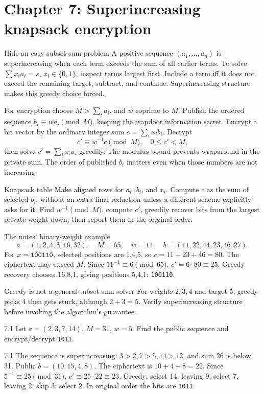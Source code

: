 \documentclass[11pt,a4paper]{article}
\begin{document}
\section{Chapter 7: Superincreasing knapsack encryption}
\begin{concept}{Hide an easy subset-sum problem}
A positive sequence \((a_1,\ldots,a_n)\) is superincreasing when each term exceeds the sum of all earlier terms. To solve \(\sum x_i a_i=s\), \(x_i\in\{0,1\}\), inspect terms largest first. Include a term iff it does not exceed the remaining target, subtract, and continue. Superincreasing structure makes this greedy choice forced.

For encryption choose \(M>\sum_i a_i\), and \(w\) coprime to \(M\). Publish the ordered sequence \(b_i\equiv wa_i\pmod M\), keeping the trapdoor information secret. Encrypt a bit vector by the ordinary integer sum \(c=\sum_i x_i b_i\). Decrypt
\[c'\equiv w^{-1}c\pmod M,\quad0\le c'<M,\]
then solve \(c'=\sum_i x_i a_i\) greedily. The modulus bound prevents wraparound in the private sum. The order of published \(b_i\) matters even when those numbers are not increasing.
\end{concept}
\begin{method}{Knapsack table}
Make aligned rows for \(a_i\), \(b_i\), and \(x_i\). Compute \(c\) as the sum of selected \(b_i\), without an extra final reduction unless a different scheme explicitly asks for it. Find \(w^{-1}\pmod M\), compute \(c'\), greedily recover bits from the largest private weight down, then report them in the original order.
\end{method}
\begin{example}{The notes' binary-weight example}
\[a=(1,2,4,8,16,32),\quad M=65,\quad w=11,\quad b=(11,22,44,23,46,27).\]
For \(x=\texttt{100110}\), selected positions are 1,4,5, so \(c=11+23+46=80\). The ciphertext may exceed \(M\). Since \(11^{-1}\equiv6\pmod{65}\), \(c'=6\cdot80\equiv25\). Greedy recovery chooses 16,8,1, giving positions 5,4,1: \texttt{100110}.
\end{example}
\begin{tip}{Greedy is not a general subset-sum solver}
For weights \(2,3,4\) and target 5, greedy picks 4 then gets stuck, although \(2+3=5\). Verify superincreasing structure before invoking the algorithm's guarantee.
\end{tip}
\begin{question}{7.1}
Let \(a=(2,3,7,14)\), \(M=31\), \(w=5\). Find the public sequence and encrypt/decrypt \texttt{1011}.
\end{question}
\begin{answer}{7.1}
The sequence is superincreasing: \(3>2,7>5,14>12\), and sum 26 is below 31. Public \(b=(10,15,4,8)\). The ciphertext is \(10+4+8=22\). Since \(5^{-1}\equiv25\pmod{31}\), \(c'\equiv25\cdot22\equiv23\). Greedy: select 14, leaving 9; select 7, leaving 2; skip 3; select 2. In original order the bits are \texttt{1011}.
\end{answer}
\end{document}
